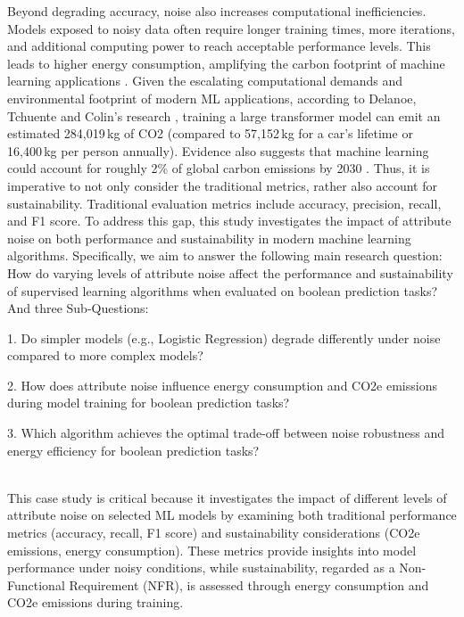 \documentclass[conference]{IEEEtran}
\begin{document}
\newline
\newline
Beyond degrading accuracy, noise also increases computational inefficiencies. Models exposed to noisy data often require longer training times, more iterations, and additional computing power to reach acceptable performance levels. This leads to higher energy consumption, amplifying the carbon footprint of machine learning applications \cite{sciencedirect}.
\newline
\newline
Given the escalating computational demands and environmental footprint of modern ML applications, according to Delanoe, Tchuente and Colin’s research \cite{DELAN}, training a large transformer model can emit an estimated 284,019 kg of CO2 (compared to 57,152 kg for a car’s lifetime or 16,400 kg per person annually). Evidence also suggests that machine learning could account for roughly 2\% of global carbon emissions by 2030 \cite{carbon_emissions}.
Thus, it is imperative to not only consider the traditional metrics, rather also account for sustainability. Traditional evaluation metrics include accuracy, precision, recall, and F1 score.
\newline 
\newline
To address this gap, this study investigates the impact of attribute noise on both performance and sustainability in modern machine learning algorithms. Specifically, we aim to answer the following main research question:
\newline
How do varying levels of attribute noise affect the performance and sustainability of supervised learning algorithms when evaluated on boolean prediction tasks?
\newline
\newline
And three Sub-Questions:
\begin{itemize}
     1. Do simpler models (e.g., Logistic Regression) degrade differently under noise compared to more complex models?
     \newline

     2. How does attribute noise influence energy consumption and CO2e emissions during model training for boolean prediction tasks?
     \newline

     3. Which algorithm achieves the optimal trade-off between noise robustness and energy efficiency for boolean prediction tasks?
\end{itemize}
\\[0.5em]
This case study is critical because it investigates the impact of different levels of attribute noise on selected ML models by examining both traditional performance metrics (accuracy, recall, F1 score) and sustainability considerations (CO2e emissions, energy consumption). These metrics provide insights into model performance under noisy conditions, while sustainability, regarded as a Non-Functional Requirement (NFR), is assessed through energy consumption and CO2e emissions during training.
\end{document}
